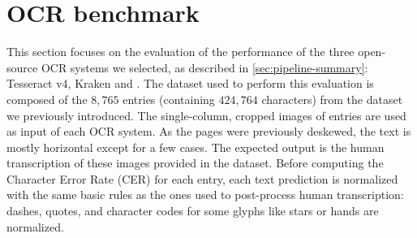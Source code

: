 \section{OCR benchmark}
\label{sec:ocr-xp}

This section focuses on the evaluation of the performance of the three open-source OCR systems we selected, as described in \cref{sec:pipeline-summary}: Tesseract v4, Kraken and \peroocr.
The dataset used to perform this evaluation is composed of the $8,765$ entries (containing $424,764$ characters) from the dataset we previously introduced.
The single-column, cropped images of entries are used as input of each OCR system.
As the pages were previously deskewed, the text is mostly horizontal except for a few cases.
The expected output is the human transcription of these images provided in the dataset.
Before computing the Character Error Rate (CER) for each entry, each text prediction is normalized with the same basic rules as the ones used to post-process human transcription: dashes, quotes, and character codes for some glyphs like stars or hands are normalized.




